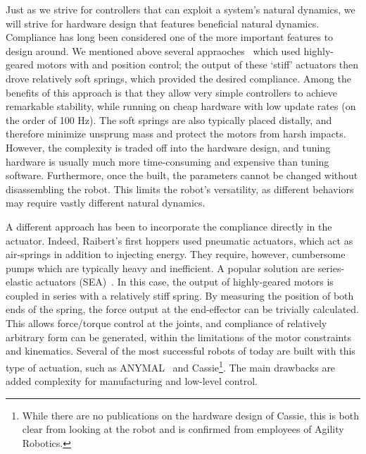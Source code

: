 Just as we strive for controllers that can exploit a system's natural dynamics, we will strive for hardware design that features beneficial natural dynamics.
Compliance has long been considered one of the more important features to design around.
We mentioned above several appraoches~\cite{sprowitz2013towards,buchli2006resonance,altendorfer2001rhex,owaki2013simple} which used highly-geared motors with and position control; the output of these `stiff' actuators then drove relatively soft springs, which provided the desired compliance. Among the benefits of this approach is that they allow very simple controllers to achieve remarkable stability, while running on cheap hardware with low update rates (on the order of 100 Hz). The soft springs are also typically placed distally, and therefore minimize unsprung mass and protect the motors from harsh impacts. However, the complexity is traded off into the hardware design, and tuning hardware is usually much more time-consuming and expensive than tuning software. Furthermore, once the built, the parameters cannot be changed without disassembling the robot. This limits the robot's versatility, as different behaviors may require vastly different natural dynamics. \par
A different approach has been to incorporate the compliance directly in the actuator. Indeed, Raibert's first hoppers used pneumatic actuators, which act as air-springs in addition to injecting energy. They require, however, cumbersome pumps which are typically heavy and inefficient.
A popular solution are series-elastic actuators (SEA)~\cite{pratt1995series}. In this case, the output of highly-geared motors is coupled in series with a relatively stiff spring. By measuring the position of both ends of the spring, the force output at the end-effector can be trivially calculated. This allows force/torque control at the joints, and compliance of relatively arbitrary form can be generated, within the limitations of the motor constraints and kinematics. Several of the most successful robots of today are built with this type of actuation, such as ANYMAL~\cite{hutter2016anymal} and Cassie\footnote{While there are no publications on the hardware design of Cassie, this is both clear from looking at the robot and is confirmed from employees of Agility Robotics.}. The main drawbacks are added complexity for manufacturing and low-level control.
\par
